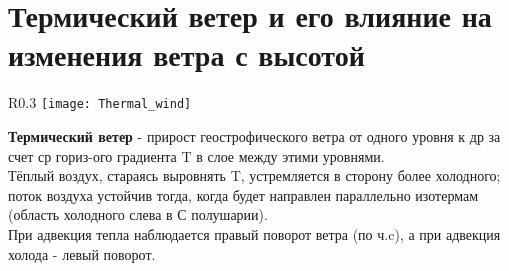 
\section{Термический ветер и его влияние на изменения ветра с высотой}
\begin{wrapfigure}[15]{R}{0.3\linewidth}
	\vspace{-6ex}
	\texttt{[image: Thermal\_wind]}
\end{wrapfigure}

\textbf{Термический ветер} - прирост геострофического ветра от одного уровня к др за счет ср гориз-ого градиента T в слое между этими уровнями.\\
Тёплый воздух, стараясь выровнять T, устремляется в сторону более холодного; поток воздуха устойчив тогда, когда будет направлен параллельно изотермам (область холодного слева в С полушарии).\\
При адвекция тепла наблюдается правый поворот ветра (по ч.c), а при адвекция холода - левый поворот.